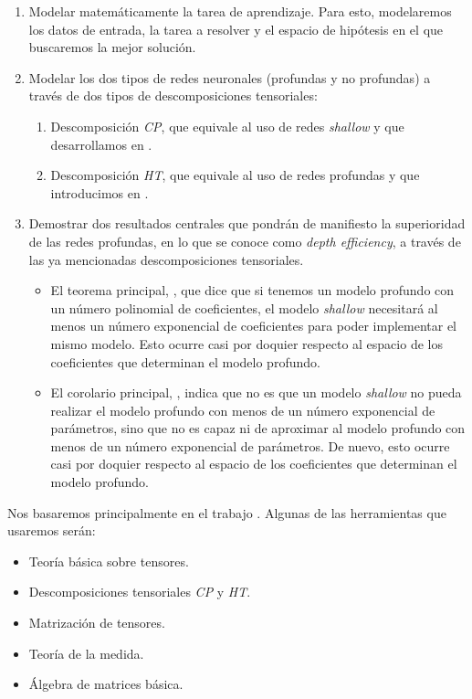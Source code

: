 \begin{enumerate}
	\item Modelar matemáticamente la tarea de aprendizaje. Para esto, modelaremos los datos de entrada, la tarea a resolver y el espacio de hipótesis en el que buscaremos la mejor solución.
	\item Modelar los dos tipos de redes neuronales (profundas y no profundas) a través de dos tipos de descomposiciones tensoriales:
	      \begin{enumerate}
		      \item Descomposición \textit{CP}, que equivale al uso de redes \textit{shallow}  y que desarrollamos en .
		      \item Descomposición \textit{HT}, que equivale al uso de redes profundas y que introducimos en .
	      \end{enumerate}
	\item Demostrar dos resultados centrales que pondrán de manifiesto la superioridad de las redes profundas, en lo que se conoce como \textit{depth efficiency}, a través de las ya mencionadas descomposiciones tensoriales.
	      \begin{itemize}
		      \item El teorema principal, , que dice que si tenemos un modelo profundo con un número polinomial de coeficientes, el modelo \textit{shallow} necesitará al menos un número exponencial de coeficientes para poder implementar el mismo modelo. Esto ocurre casi por doquier respecto al espacio de los coeficientes que determinan el modelo profundo.
		      \item El corolario principal, , indica que no es que un modelo \textit{shallow} no pueda realizar el modelo profundo con menos de un número exponencial de parámetros, sino que no es capaz ni de aproximar al modelo profundo con menos de un número exponencial de parámetros. De nuevo, esto ocurre casi por doquier respecto al espacio de los coeficientes que determinan el modelo profundo.
	      \end{itemize}
\end{enumerate}

Nos basaremos principalmente en el trabajo \cite{matematicas:principal}. Algunas de las herramientas que usaremos serán:

\begin{itemize}
	\item Teoría básica sobre tensores.
	\item Descomposiciones tensoriales \textit{CP} y \textit{HT}.
	\item Matrización de tensores.
	\item Teoría de la medida.
	\item Álgebra de matrices básica.
\end{itemize}

